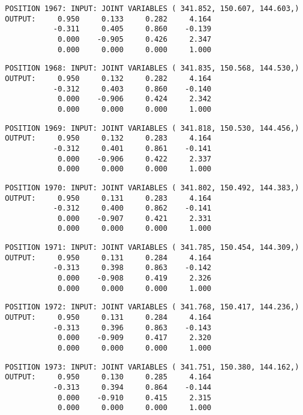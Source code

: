 \begin{verbatim}
POSITION 1967: INPUT: JOINT VARIABLES ( 341.852, 150.607, 144.603,)
OUTPUT:     0.950     0.133     0.282     4.164
           -0.311     0.405     0.860    -0.139
            0.000    -0.905     0.426     2.347
            0.000     0.000     0.000     1.000
\end{verbatim} \pagebreak[1]\begin{verbatim}
POSITION 1968: INPUT: JOINT VARIABLES ( 341.835, 150.568, 144.530,)
OUTPUT:     0.950     0.132     0.282     4.164
           -0.312     0.403     0.860    -0.140
            0.000    -0.906     0.424     2.342
            0.000     0.000     0.000     1.000
\end{verbatim} \pagebreak[1]\begin{verbatim}
POSITION 1969: INPUT: JOINT VARIABLES ( 341.818, 150.530, 144.456,)
OUTPUT:     0.950     0.132     0.283     4.164
           -0.312     0.401     0.861    -0.141
            0.000    -0.906     0.422     2.337
            0.000     0.000     0.000     1.000
\end{verbatim} \pagebreak[1]\begin{verbatim}
POSITION 1970: INPUT: JOINT VARIABLES ( 341.802, 150.492, 144.383,)
OUTPUT:     0.950     0.131     0.283     4.164
           -0.312     0.400     0.862    -0.141
            0.000    -0.907     0.421     2.331
            0.000     0.000     0.000     1.000
\end{verbatim} \pagebreak[1]\begin{verbatim}
POSITION 1971: INPUT: JOINT VARIABLES ( 341.785, 150.454, 144.309,)
OUTPUT:     0.950     0.131     0.284     4.164
           -0.313     0.398     0.863    -0.142
            0.000    -0.908     0.419     2.326
            0.000     0.000     0.000     1.000
\end{verbatim} \pagebreak[1]\begin{verbatim}
POSITION 1972: INPUT: JOINT VARIABLES ( 341.768, 150.417, 144.236,)
OUTPUT:     0.950     0.131     0.284     4.164
           -0.313     0.396     0.863    -0.143
            0.000    -0.909     0.417     2.320
            0.000     0.000     0.000     1.000
\end{verbatim} \pagebreak[1]\begin{verbatim}
POSITION 1973: INPUT: JOINT VARIABLES ( 341.751, 150.380, 144.162,)
OUTPUT:     0.950     0.130     0.285     4.164
           -0.313     0.394     0.864    -0.144
            0.000    -0.910     0.415     2.315
            0.000     0.000     0.000     1.000
\end{verbatim} \pagebreak[1]\begin{verbatim}

\end{verbatim}

